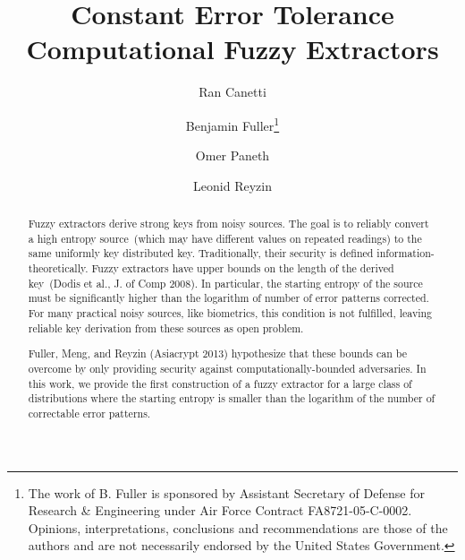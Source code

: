 \documentclass[11pt]{article}
\title{Constant Error Tolerance Computational Fuzzy Extractors}
\author{Ran Canetti \and Benjamin Fuller\footnote{The work of B. Fuller is sponsored by Assistant Secretary of Defense for Research \& Engineering under Air Force Contract FA8721-05-C-0002. Opinions, interpretations, conclusions and recommendations are those of the authors and are not necessarily endorsed by the United States Government.} \and Omer Paneth \and Leonid Reyzin}
\begin{document}
\maketitle


\begin{abstract} 
Fuzzy extractors derive strong keys from noisy sources.  The goal is to reliably convert a high entropy source~(which may have different values on repeated readings) to the same uniformly key distributed key.  Traditionally, their security is defined information-theoretically.  Fuzzy extractors have upper bounds on the length of the derived key~(Dodis et al., J. of Comp 2008).  In particular, the starting entropy of the source must be significantly higher than the logarithm of number of error patterns corrected.  For many practical noisy sources, like biometrics, this condition is not fulfilled, leaving reliable key derivation from these sources as open problem.  

Fuller, Meng, and Reyzin (Asiacrypt 2013) hypothesize that these bounds can be overcome by only providing security against computationally-bounded adversaries.  %
In this work, we provide the first construction of a fuzzy extractor for a large class of distributions where the starting entropy is smaller than the logarithm of the number of correctable error patterns.


\end{abstract}
\end{document}
